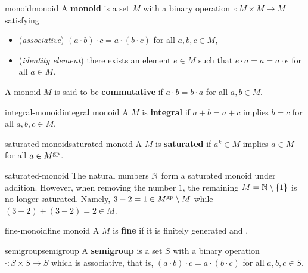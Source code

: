 \begin{topic}{monoid}{monoid}
    A \textbf{monoid} is a set $M$ with a binary operation $\cdot : M \times M \to M$ satisfying
    \begin{itemize}
        \item (\textit{associative}) $(a \cdot b) \cdot c = a \cdot (b \cdot c)$ for all $a, b, c \in M$,
        \item (\textit{identity element}) there exists an element $e \in M$ such that $e \cdot a = a = a \cdot e$ for all $a \in M$.
    \end{itemize}
    A monoid $M$ is said to be \textbf{commutative} if $a \cdot b = b \cdot a$ for all $a, b \in M$.
\end{topic}

\begin{topic}{integral-monoid}{integral monoid}
    A  $M$ is \textbf{integral} if $a + b = a + c$ implies $b = c$ for all $a, b, c \in M$.
\end{topic}

\begin{topic}{saturated-monoid}{saturated monoid}
    A  $M$ is \textbf{saturated} if $a^k \in M$ implies $a \in M$ for all $a \in M^\textup{gp}$.
\end{topic}

\begin{example}{saturated-monoid}
    The natural numbers $\mathbb{N}$ form a saturated monoid under addition. However, when removing the number $1$, the remaining $M = \mathbb{N} \setminus \{ 1 \}$ is no longer saturated. Namely, $3 - 2 = 1 \in M^\textup{gp} \setminus M$ while $(3 - 2) + (3 - 2) = 2 \in M$.
\end{example}

\begin{topic}{fine-monoid}{fine monoid}
    A  $M$ is \textbf{fine} if it is finitely generated and .
\end{topic}

\begin{topic}{semigroup}{semigroup}
    A \textbf{semigroup} is a set $S$ with a binary operation $\cdot : S \times S \to S$ which is associative, that is, $(a \cdot b) \cdot c = a \cdot (b \cdot c)$ for all $a, b, c \in S$.
\end{topic}

